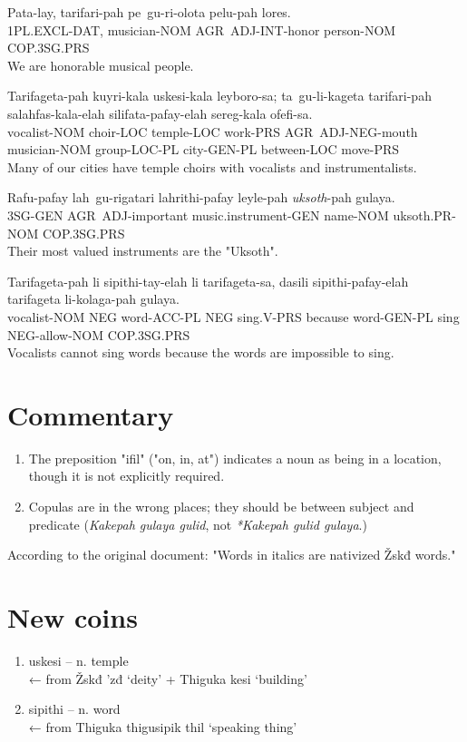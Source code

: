 \documentclass{thiguka}
\begin{document}
\begin{exe}
    \ex{} \gll{}Pata-lay, tarifari-pah pe~gu-ri-olota pelu-pah lores.\\
                1PL.EXCL-DAT, musician-NOM AGR~ADJ-INT-honor person-NOM COP.3SG.PRS\\
          \glt{}We are honorable musical people.
\end{exe}

\begin{exe}
    \ex{} \gll{}Tarifageta-pah kuyri-kala uskesi-kala leyboro-sa; ta~gu-li-kageta tarifari-pah salahfas-kala-elah silifata-pafay-elah sereg-kala ofefi-sa.\\
                vocalist-NOM choir-LOC temple-LOC work-PRS AGR~ADJ-NEG-mouth musician-NOM group-LOC-PL city-GEN-PL between-LOC move-PRS\\
          \glt{}Many of our cities have temple choirs with vocalists and instrumentalists.
\end{exe}

\begin{exe}
    \ex{} \gll{}Rafu-pafay lah~gu-rigatari lahrithi-pafay leyle-pah \textit{uksoth}-pah gulaya.\\
                3SG-GEN AGR~ADJ-important music.instrument-GEN name-NOM uksoth.PR-NOM COP.3SG.PRS\\
          \glt{}Their most valued instruments are the "Uksoth".
\end{exe}

\begin{exe}
    \ex{} \gll{}Tarifageta-pah li sipithi-tay-elah li tarifageta-sa, dasili sipithi-pafay-elah tarifageta li-kolaga-pah gulaya.\\
                vocalist-NOM NEG word-ACC-PL NEG sing.V-PRS because word-GEN-PL sing NEG-allow-NOM COP.3SG.PRS\\
          \glt{}Vocalists cannot sing words because the words are impossible to sing.
\end{exe}

\newpage

\section{Commentary}
\begin{enumerate}
    \item The preposition "ifil" ("on, in, at") indicates a noun as being in a location, though it is not explicitly required.
    \item Copulas are in the wrong places; they should be between subject and predicate (\textit{Kakepah gulaya gulid}, not \textit{*Kakepah gulid gulaya}.)
\end{enumerate}

According to the original document: "Words in italics are nativized Žskđ words."

\section{New coins}

\begin{enumerate}
\item uskesi -- n. temple \\ ← from Žskđ ’zđ ‘deity’ + Thiguka kesi ‘building’
\item sipithi -- n. word \\ ← from Thiguka thigusipik thil ‘speaking thing’
\end{enumerate}
\end{document}
